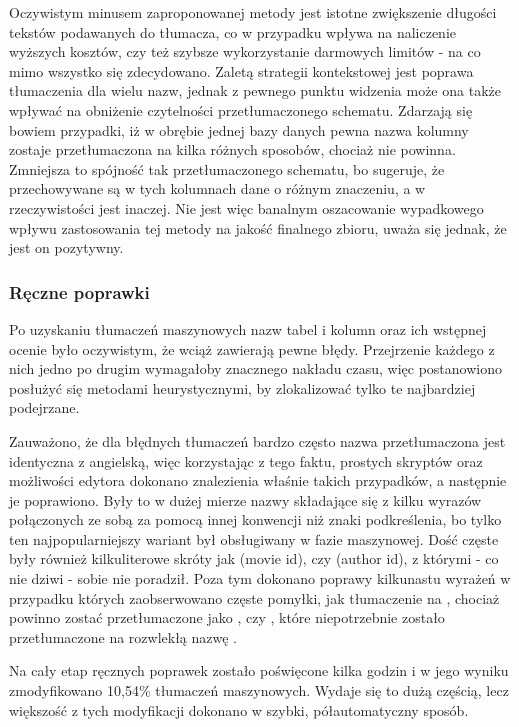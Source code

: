 Oczywistym minusem zaproponowanej metody jest istotne zwiększenie długości tekstów podawanych do tłumacza, co w przypadku  wpływa na naliczenie wyższych kosztów, czy też szybsze wykorzystanie darmowych limitów - na co mimo wszystko się zdecydowano. Zaletą strategii kontekstowej jest poprawa tłumaczenia dla wielu nazw, jednak z pewnego punktu widzenia może ona także wpływać na obniżenie czytelności przetłumaczonego schematu. Zdarzają się bowiem przypadki, iż w obrębie jednej bazy danych pewna nazwa kolumny zostaje przetłumaczona na kilka różnych sposobów, chociaż nie powinna. Zmniejsza to spójność tak przetłumaczonego schematu, bo sugeruje, że przechowywane są w tych kolumnach dane o różnym znaczeniu, a w rzeczywistości jest inaczej. Nie jest więc banalnym oszacowanie wypadkowego wpływu zastosowania tej metody na jakość finalnego zbioru, uważa się jednak, że jest on pozytywny.

\subsubsection{Ręczne poprawki}
Po uzyskaniu tłumaczeń maszynowych nazw tabel i kolumn oraz ich wstępnej ocenie było oczywistym, że wciąż zawierają pewne błędy. Przejrzenie każdego z nich jedno po drugim wymagałoby znacznego nakładu czasu, więc postanowiono posłużyć się metodami heurystycznymi, by zlokalizować tylko te najbardziej podejrzane. 

Zauważono, że dla błędnych tłumaczeń bardzo często nazwa przetłumaczona jest identyczna z angielską, więc korzystając z tego faktu, prostych skryptów oraz możliwości edytora  dokonano znalezienia właśnie takich przypadków, a następnie je poprawiono. Były to w dużej mierze nazwy składające się z kilku wyrazów połączonych ze sobą za pomocą innej konwencji niż znaki podkreślenia, bo tylko ten najpopularniejszy wariant był obsługiwany w fazie maszynowej. Dość częste były również kilkuliterowe skróty jak  (movie id), czy  (author id), z którymi - co nie dziwi -  sobie nie poradził. Poza tym dokonano poprawy kilkunastu wyrażeń w przypadku których zaobserwowano częste pomyłki, jak tłumaczenie  na , chociaż powinno zostać przetłumaczone jako , czy , które niepotrzebnie zostało przetłumaczone na rozwlekłą nazwę .

Na cały etap ręcznych poprawek zostało poświęcone kilka godzin i w jego wyniku zmodyfikowano 10,54\% tłumaczeń maszynowych. Wydaje się to dużą częścią, lecz większość z tych modyfikacji dokonano w szybki, półautomatyczny sposób.


